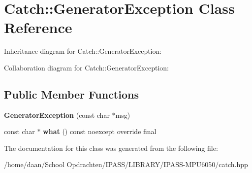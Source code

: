 \hypertarget{classCatch_1_1GeneratorException}{}\section{Catch\+:\+:Generator\+Exception Class Reference}
\label{classCatch_1_1GeneratorException}


Inheritance diagram for Catch\+:\+:Generator\+Exception\+:


Collaboration diagram for Catch\+:\+:Generator\+Exception\+:
\subsection*{Public Member Functions}
\begin{DoxyCompactItemize}
\item 
\mbox{\label{classCatch_1_1GeneratorException_a3cf9282d555ec32389665ce723bf36ea}} 
{\bfseries Generator\+Exception} (const char $\ast$msg)
\item 
\mbox{\label{classCatch_1_1GeneratorException_ade029163144d136f12187e5b9a0161d5}} 
const char $\ast$ {\bfseries what} () const noexcept override final
\end{DoxyCompactItemize}


The documentation for this class was generated from the following file\+:\begin{DoxyCompactItemize}
\item 
/home/daan/\+School Opdrachten/\+I\+P\+A\+S\+S/\+L\+I\+B\+R\+A\+R\+Y/\+I\+P\+A\+S\+S-\/\+M\+P\+U6050/catch.\+hpp\end{DoxyCompactItemize}

